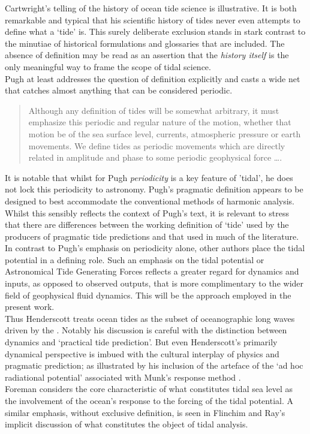 Cartwright's \cite{Cartwright:2000tt} telling of the history of ocean tide science is illustrative. It is both remarkable and typical that his scientific history of tides never even attempts to define what a `tide' is.  This surely deliberate exclusion stands in stark contrast to the minutiae of historical formulations and glossaries that are included.  The absence of definition may be read as an assertion that the \emph{history itself} is the only meaningful way to frame the scope of tidal science.\\
Pugh \cite{Pugh:1996uz} at least addresses the question of definition explicitly and casts a wide net that catches almost anything that can be considered periodic.
\begin{quote}
Although any definition of tides will be somewhat arbitrary, it must emphasize this periodic and regular nature of the motion, whether that motion be of the sea surface level, currents, atmospheric pressure or earth movements. We define tides as periodic movements which are directly related in amplitude and phase to some periodic geophysical force \ldots.
\end{quote}
It is notable that whilst for Pugh \emph{periodicity} is a key feature of 'tidal', he does not lock this periodicity to astronomy.  Pugh's pragmatic definition appears to be designed to best accommodate the conventional methods of harmonic analysis. Whilst this sensibly reflects the context of Pugh's text, it is relevant to stress that there are differences between the working definition of `tide' used by the producers of pragmatic tide predictions and that used in much of the literature.\\
In contrast to Pugh's emphasis on periodicity alone, other authors place the tidal potential in a defining role. Such an emphasis on the tidal potential or Astronomical Tide Generating Forces \ATGP{} reflects a greater regard for dynamics and inputs, as opposed to observed outputs, that is more complimentary to the wider field of geophysical fluid dynamics.  This will be the approach employed in the present work.\\
Thus Henderscott \cite{Hendershott:1981ub} treats ocean tides as the subset of oceanographic long waves driven by the \ATGP{}.  Notably his discussion is careful with the distinction between dynamics and `practical tide prediction'. But even Henderscott's primarily dynamical perspective is imbued with the cultural interplay of physics and pragmatic prediction; as illustrated by his inclusion of the arteface of the `ad hoc radiational potential' associated with Munk's response method \cite{Munk:1966ts}.\\
Foreman \cite{foreman:2012perscomm} considers the core characteristic of what constitutes tidal sea level as the involvement of the ocean's response to the forcing of the tidal potential.   A similar emphasis, without exclusive definition, is seen in Flinchim and Ray's \citep{Flinchem:2000kp} implicit discussion of what constitutes the object of tidal analysis.\\



